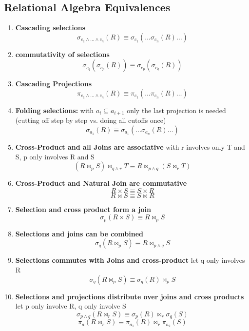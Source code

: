 \subsection{Relational Algebra Equivalences}
\begin{enumerate}
    \item \textbf{Cascading selections}
    \[ \sigma_{c_1 \wedge \dots \wedge c_n}(R) \equiv \sigma_{c_1}(\dots \sigma_{c_n}(R) \dots) \]
    
    \item \textbf{commutativity of selections}
    \[ \sigma_{c_q }( \sigma_{c_p}(R) ) \equiv \sigma_{c_p}( \sigma_{c_q}(R) ) \]
    
        \item \textbf{Cascading Projections}
    \[ \pi_{c_1 \wedge \dots \wedge c_n}(R) \equiv \pi_{c_1}(\dots \pi_{c_n}(R) \dots) \]
    
    \item \textbf{Folding selections:} with $a_i \subseteq a_{i+1}$ only the last projection is needed (cutting off step by step vs. doing all cutoffs once)
    \[ \sigma_{a_1}(R) \equiv \sigma_{a_1}(\dots \sigma_{a_n}(R) \dots) \]
    
    \item \textbf{Cross-Product and all Joins are associative} with r involves only T and S, p only involves R and S
    \[ (R \bowtie_p S) \bowtie_{q \wedge r} T \equiv R \bowtie_{p \wedge q} (S \bowtie_r T) \]
    
    \item \textbf{Cross-Product and Natural Join are commutative}
    \[ R \times S \equiv S \times R \]
    \[ R \bowtie S \equiv S \bowtie R \]
    
    \item \textbf{Selection and cross product form a join}
    \[ \sigma_p(R \times S) \equiv R \bowtie_p S \] 
    
    \item \textbf{Selections and joins can be combined}
    \[ \sigma_q(R \bowtie_p S) \equiv R \bowtie_{p \wedge q} S \] 
    
    \item \textbf{Selections commutes with Joins and cross-product} let q only involves R
    \[ \sigma_q(R \bowtie_p S) \equiv \sigma_q(R) \bowtie_{p} S \]     
    
    \item \textbf{Selections and projections distribute over joins and cross products} let p only involve R, q only involve S
    \[ \sigma_{p \wedge q}(R \bowtie_r S) \equiv \sigma_p(R) \bowtie_{r} \sigma_q(S) \] 
    \[ \pi_{a}(R \bowtie_r S) \equiv \pi_{a_1}(R) \bowtie_{r} \pi_{a_2}(S) \] 
    

\end{enumerate}
